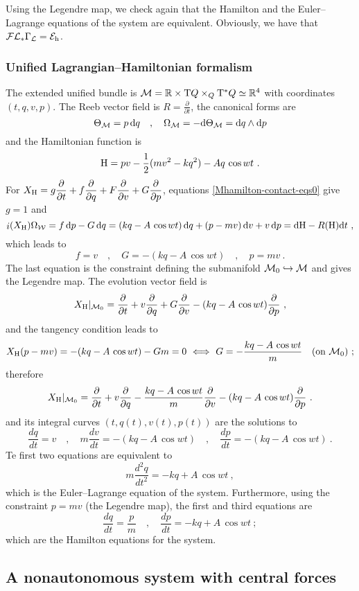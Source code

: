 \documentclass[12pt]{report}
\def\dst{\displaystyle}
\def\derpar#1#2{\frac{\partial{#1}}{\partial{#2}}}
\def\Lag{{\cal L}}
\def\d{{\rm d}}
\def\Real{\mathbb{R}}
\def\Tan{{\rm T}}
\def\inn{\mathop{i}\nolimits}
\def\Leg{{\cal F}\Lag}
\begin{document}
Using the Legendre map, we check again that the Hamilton and
the Euler--Lagrange equations of the system are equivalent.
Obviously, we have that $\Leg_*\Gamma_\Lag={\cal E}_{\rm h}$.


\subsubsection{Unified Lagrangian--Hamiltonian formalism}


The extended unified bundle is ${\cal M}=\Real\times\Tan Q\times_Q\Tan^*Q\simeq\Real^4$
with coordinates $(t,q,v,p)$. The Reeb vector field is $\dst R=\derpar{}{t}$, 
the canonical forms are
$$
\Theta_{\cal M}=p\,\d q \quad , \quad
\Omega_{\cal M}=-\d\Theta_{\cal M}=\d q\wedge\d p
$$
and the Hamiltonian function is
$$
{\rm H}=pv-\frac{1}{2}(mv^2-kq^2)-Aq\,\cos w t  \ .
$$
For $\displaystyle X_{\rm H}=g\derpar{}{t}+f\derpar{}{q}+F\derpar{}{v}+G\derpar{}{p}$,
equations \eqref{Mhamilton-contact-eqs0} give $g=1 $ and
$$
\inn(X_{\rm H})\Omega_{\cal W}= f\, \d p-G\, \d q=
(kq-A\,\cos w t)\, \d q+(p-mv)\,\d v+v\, \d p=\d{\rm H}-R({\rm H})\d t\ ,
$$
which leads to
$$
f=v \quad , \quad G=-(kq-A\,\cos w t ) \quad , \quad p=mv  \ .
$$
The last equation is the constraint defining the submanifold
${\cal M}_0\hookrightarrow{\cal M}$ and gives the Legendre map.
The evolution vector field is
$$
X_{\rm H}\vert_{{\cal M}_0}=\derpar{}{t}+v\derpar{}{q}+G\derpar{}{v}-
(kq-A\,\cos w t )\derpar{}{p} \ ,
$$
and the tangency condition leads to
$$
X_{\rm H}(p-mv)=-(kq-A\,\cos w t )-Gm=0 \ \Longleftrightarrow\
G=-\frac{kq-A\,\cos w t}{m} \quad \mbox{\rm (on ${\cal M}_0$)} \ ;
$$
therefore
$$
X_{\rm H}\vert_{{\cal M}_0}=\derpar{}{t}+v\derpar{}{q}
-\frac{kq-A\,\cos w t}{m}\derpar{}{v}-(kq-A\,\cos w t)\derpar{}{p} \ .
$$
and its integral curves $(t,q(t),v(t),p(t))$ are the solutions to
$$
\frac{dq}{dt}=v \quad , \quad
m\frac{dv}{dt}=-(kq-A\,\cos w t) \quad , \quad
\frac{dp}{dt}=-(kq-A\,\cos w t) \ .
$$
Te first two equations are equivalent to
$$
m\frac{d^2q}{dt^2}=-kq+A\,\cos w t \ ,
$$
which is the Euler--Lagrange equation of the system. 
Furthermore, using the constraint $p=mv$ (the Legendre map),
the first and third equations are
$$
\frac{dq}{dt}=\frac{p}{m} \quad , \quad
\frac{dp}{dt}=-kq+A\,\cos w t \ ;
$$
which are the Hamilton equations for the system.


\subsection{A nonautonomous system with central forces}
\end{document}
